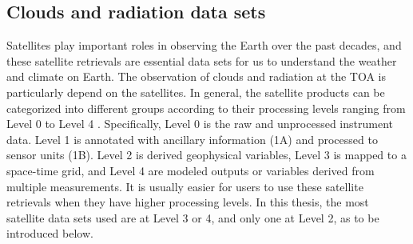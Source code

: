 \subsection{Clouds and radiation data sets}
Satellites play important roles in observing the Earth over the past decades, and these satellite retrievals are essential data sets for us to understand the weather and climate on Earth. The observation of clouds and radiation at the TOA is particularly depend on the satellites. In general, the satellite products can be categorized into different groups according to their processing levels ranging from Level 0 to Level 4 \citep{Parkinson2006earth}. Specifically, Level 0 is the raw and unprocessed instrument data. Level 1 is annotated with ancillary information (1A) and processed to sensor units (1B). Level 2 is derived geophysical variables, Level 3 is mapped to a space-time grid, and Level 4 are modeled outputs or variables derived from multiple measurements. It is usually easier for users to use these satellite retrievals when they have higher processing levels. In this thesis, the most satellite data sets used are at Level 3 or 4, and only one at Level 2, as to be introduced below.




